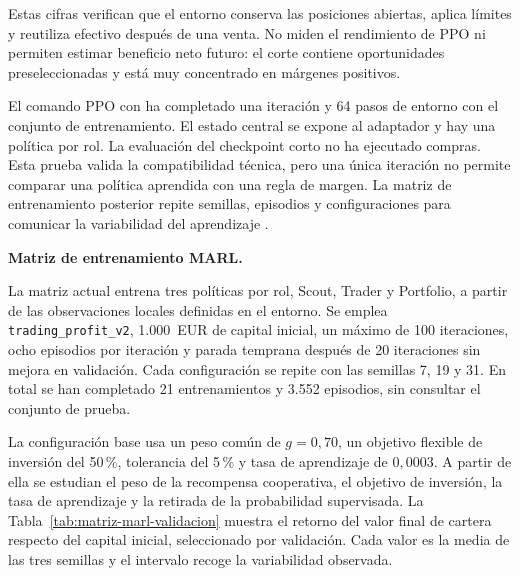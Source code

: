 Estas cifras verifican que el entorno conserva las posiciones abiertas, aplica límites y reutiliza efectivo después de una venta. No miden el rendimiento de PPO ni permiten estimar beneficio neto futuro: el corte contiene oportunidades preseleccionadas y está muy concentrado en márgenes positivos.

El comando PPO con  ha completado una iteración y 64 pasos de entorno con el conjunto de entrenamiento. El estado central se expone al adaptador y hay una política por rol. La evaluación del checkpoint corto no ha ejecutado compras. Esta prueba valida la compatibilidad técnica, pero una única iteración no permite comparar una política aprendida con una regla de margen. La matriz de entrenamiento posterior repite semillas, episodios y configuraciones para comunicar la variabilidad del aprendizaje \cite{agarwal2021deep}.

\textbf{Matriz de entrenamiento MARL.}

La matriz actual entrena tres políticas por rol, Scout, Trader y Portfolio, a partir de las observaciones locales definidas en el entorno. Se emplea \texttt{trading\_profit\_v2}, 1.000~EUR de capital inicial, un máximo de 100 iteraciones, ocho episodios por iteración y parada temprana después de 20 iteraciones sin mejora en validación. Cada configuración se repite con las semillas 7, 19 y 31. En total se han completado 21 entrenamientos y 3.552 episodios, sin consultar el conjunto de prueba.

La configuración base usa un peso común de $g=0{,}70$, un objetivo flexible de inversión del 50\,\%, tolerancia del 5\,\% y tasa de aprendizaje de $0{,}0003$. A partir de ella se estudian el peso de la recompensa cooperativa, el objetivo de inversión, la tasa de aprendizaje y la retirada de la probabilidad supervisada. La Tabla~\ref{tab:matriz-marl-validacion} muestra el retorno del valor final de cartera respecto del capital inicial, seleccionado por validación. Cada valor es la media de las tres semillas y el intervalo recoge la variabilidad observada.

